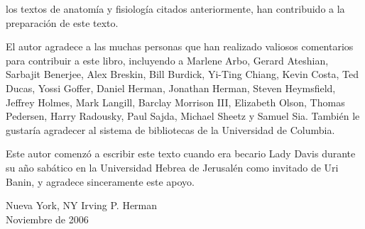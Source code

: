 ﻿\documentclass{book}
\begin{document}
los textos de anatomía y fisiología citados anteriormente, han contribuido a la preparación de este texto.

El autor agradece a las muchas personas que han realizado valiosos comentarios para contribuir a este libro, incluyendo a Marlene Arbo, Gerard Ateshian, Sarbajit Benerjee, Alex Breskin, Bill Burdick, Yi-Ting Chiang, Kevin Costa, Ted Ducas, Yossi Goffer, Daniel Herman, Jonathan Herman, Steven Heymsfield, Jeffrey Holmes, Mark Langill, Barclay Morrison III, Elizabeth Olson, Thomas Pedersen, Harry Radousky, Paul Sajda, Michael Sheetz y Samuel Sia. También le gustaría agradecer al sistema de bibliotecas de la Universidad de Columbia.

Este autor comenzó a escribir este texto cuando era becario Lady Davis durante su año sabático en la Universidad Hebrea de Jerusalén como invitado de Uri Banin, y agradece sinceramente este apoyo.

\vspace{1.5em}
\noindent Nueva York, NY \hfill Irving P. Herman \\
Noviembre de 2006
\end{document}
